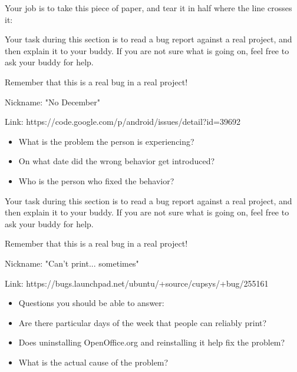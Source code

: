 \documentclass[12pt]{article}
\begin{document}
Your job is to take this piece of paper, and tear it in half
where the line crosses it:

\hrulefill

Your task during this section is to read a bug report against a real project, and 
then explain it to your buddy. If you are not sure what is going on, feel free to 
ask your buddy for help.

Remember that this is a real bug in a real project!

Nickname: "No December"

Link: https://code.google.com/p/android/issues/detail?id=39692

\begin{itemize}
\item What is the problem the person is experiencing?
\item On what date did the wrong behavior get introduced?
\item Who is the person who fixed the behavior?
\end{itemize}

\hrulefill



Your task during this section is to read a bug report against a real project, and 
then explain it to your buddy. If you are not sure what is going on, feel free to 
ask your buddy for help.

Remember that this is a real bug in a real project!

Nickname: "Can't print... sometimes"

Link: https://bugs.launchpad.net/ubuntu/+source/cupsys/+bug/255161

\begin{itemize}
\item Questions you should be able to answer:
\item Are there particular days of the week that people can reliably print?
\item Does uninstalling OpenOffice.org and reinstalling it help fix the problem?
\item What is the actual cause of the problem?
\end{itemize}
\end{document}
